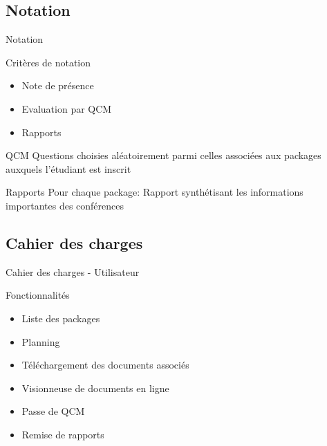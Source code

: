 \subsection{Notation}
\begin{frame}{Notation}
    \begin{block}{Critères de notation}
    \begin{itemize}
    \item Note de présence
    \item Evaluation par QCM
    \item Rapports
    \end{itemize}
    \end{block}

    \begin{block}{QCM}
    Questions choisies aléatoirement parmi celles associées aux packages auxquels l'étudiant est inscrit
    \end{block}

    \begin{block}{Rapports}
    Pour chaque package: Rapport synthétisant les informations importantes des conférences
    \end{block}
\end{frame}

\subsection{Cahier des charges}
\begin{frame}{Cahier des charges - Utilisateur}
    \begin{block}{Fonctionnalités}
    \begin{itemize}
    \item Liste des packages
    \item Planning
    \item Téléchargement des documents associés
    \item Visionneuse de documents en ligne
    \item Passe de QCM
    \item Remise de rapports
    \end{itemize}
    \end{block}
\end{frame}

